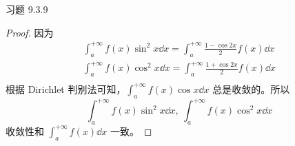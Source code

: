 \begin{problem}
	习题 9.3.9
	\begin{proof}
		因为
		$$
		\begin{gathered}
			\int_{a}^{+\infty} f(x) \sin^2 x \dd{x} = \int_{a}^{+\infty} \frac{1 - \cos 2x}{2} f(x) \dd{x} \\
			\int_{a}^{+\infty} f(x) \cos^2 x \dd{x} = \int_{a}^{+\infty} \frac{1 + \cos 2x}{2} f(x) \dd{x} \\
		\end{gathered}
		$$
		根据 Dirichlet 判别法可知，$\displaystyle \int_{a}^{+\infty} f(x) \cos x \dd{x}$ 总是收敛的。所以
		$$
		\int_{a}^{+\infty} f(x) \sin^2 x \dd{x},\ \int_{a}^{+\infty} f(x) \cos^2 x \dd{x}
		$$
		收敛性和 $\displaystyle \int_{a}^{+\infty} f(x) \dd{x}$ 一致。
	\end{proof}
\end{problem}